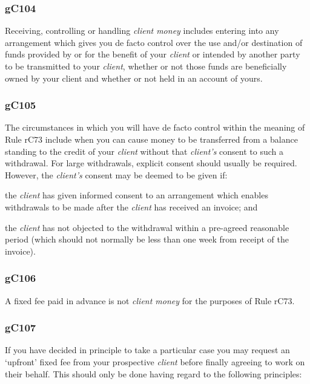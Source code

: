 \subsubsection{\color{darkgrey}gC104}

Receiving, controlling or handling \emph{client money} includes entering
into any arrangement which gives you de facto control over the use
and/or destination of funds provided by or for the benefit of your
\emph{client} or intended by another party to be transmitted to your
\emph{client}, whether or not those funds are beneficially owned by your
client and whether or not held in an account of yours.

\subsubsection{\color{darkgrey}gC105}

The circumstances in which you will have de facto control within the
meaning of Rule rC73 include when you can cause money to be transferred
from a balance standing to the credit of your \emph{client} without that
\emph{client's} consent to such a withdrawal. For large withdrawals,
explicit consent should usually be required. However, the
\emph{client's} consent may be deemed to be given if:
\begin{numlist}\item the \emph{client} has given informed consent to an arrangement which
enables withdrawals to be made after the \emph{client} has received an
invoice; and
\item the \emph{client} has not objected to the withdrawal within a
pre-agreed reasonable period (which should not normally be less than one
week from receipt of the invoice).
\end{numlist}

\subsubsection{\color{darkgrey}gC106}

A fixed fee paid in advance is not \emph{client money} for the purposes
of Rule rC73.

\subsubsection{\color{darkgrey}gC107}

If you have decided in principle to take a particular case you may
request an `upfront' fixed fee from your prospective \emph{client}
before finally agreeing to work on their behalf. This should only be
done having regard to the following principles:

